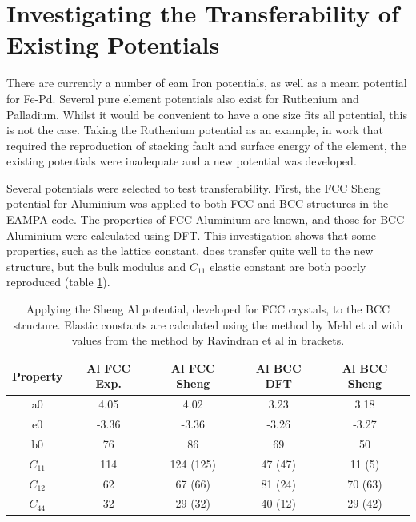 


\section[Potential Transferability]{Investigating the Transferability of Existing Potentials}

There are currently a number of \acrshort{eam} Iron potentials, as well as a \acrshort{meam} potential for Fe-Pd.  Several pure element potentials also exist for Ruthenium and Palladium.  Whilst it would be convenient to have a one size fits all potential, this is not the case.  Taking the Ruthenium potential as an example, in work that required the reproduction of stacking fault and surface energy of the element, the existing potentials were inadequate and a new potential was developed\cite{mendelevruau}.

Several potentials were selected to test transferability.  First, the FCC Sheng potential for Aluminium was applied to both FCC and BCC structures in the EAMPA code.  The properties of FCC Aluminium are known, and those for BCC Aluminium were calculated using DFT.  This investigation shows that some properties, such as the lattice constant, does transfer quite well to the new structure, but the bulk modulus and $C_{11}$ elastic constant are both poorly reproduced (table \ref{table:alshengtransferability}).  

\begin{table}[h]
\begin{center}
\begin{tabular}{c c c c c}
\hline\hline
Property   & Al FCC Exp. & Al FCC Sheng &  Al BCC DFT & Al BCC Sheng \\
\hline\hline
a0             & 4.05  &  4.02        & 3.23     & 3.18     \\
e0             & -3.36 & -3.36        & -3.26    & -3.27    \\
b0             & 76    &  86          & 69       & 50       \\
$C_{11}$       & 114   &  124 (125)   & 47 (47)  & 11 (5)   \\
$C_{12}$       & 62    &  67 (66)     & 81 (24)  & 70 (63)  \\
$C_{44}$       & 32    &  29 (32)     & 40 (12)  & 29 (42)  \\
\hline\hline
\end{tabular}
\end{center}
\caption{Applying the Sheng Al potential, developed for FCC crystals, to the BCC structure.  Elastic constants are calculated using the method by Mehl et al with values from the method by Ravindran et al in brackets.}
\label{table:alshengtransferability}
\end{table}

